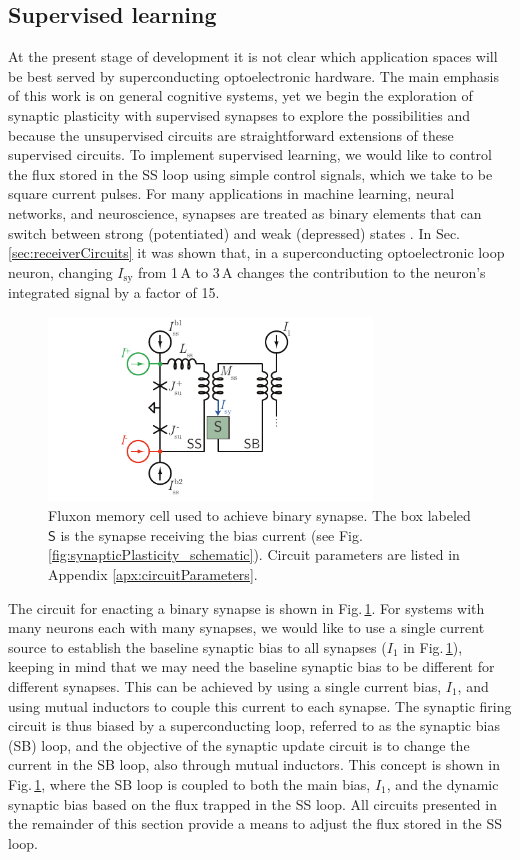 \documentclass[twocolumn]{article}
\begin{document}
\subsection{\label{sec:supervised}Supervised learning}
At the present stage of development it is not clear which application spaces will be best served by superconducting optoelectronic hardware. The main emphasis of this work is on general cognitive systems, yet we begin the exploration of synaptic plasticity with supervised synapses to explore the possibilities and because the unsupervised circuits are straightforward extensions of these supervised circuits. To implement supervised learning, we would like to control the flux stored in the SS loop using simple control signals, which we take to be square current pulses. For many applications in machine learning, neural networks, and neuroscience, synapses are treated as binary elements that can switch between strong (potentiated) and weak (depressed) states \cite{amfu1994,fuab2007,lide2015}. In Sec.\,\ref{sec:receiverCircuits} it was shown that, in a superconducting optoelectronic loop neuron, changing $I_{\mathrm{sy}}$ from 1\,\textmu A to 3\,\textmu A changes the contribution to the neuron's integrated signal by a factor of 15. 
\begin{figure}[t!]
	\centerline{\includegraphics[width=8.6cm]{_synapticPlasticity_binaryCircuit_small.pdf}}
	\caption{\label{fig:synapticPlasticity_binaryCircuit}Fluxon memory cell used to achieve binary synapse. The box labeled $\mathsf{S}$ is the synapse receiving the bias current (see Fig.\,\ref{fig:synapticPlasticity_schematic}). Circuit parameters are listed in Appendix \ref{apx:circuitParameters}.}
\end{figure}
The circuit for enacting a binary synapse is shown in Fig.\,\ref{fig:synapticPlasticity_binaryCircuit}. For systems with many neurons each with many synapses, we would like to use a single current source to establish the baseline synaptic bias to all synapses ($I_1$ in Fig.\,\ref{fig:synapticPlasticity_binaryCircuit}), keeping in mind that we may need the baseline synaptic bias to be different for different synapses. This can be achieved by using a single current bias, $I_1$, and using mutual inductors to couple this current to each synapse. The synaptic firing circuit is thus biased by a superconducting loop, referred to as the synaptic bias (SB) loop, and the objective of the synaptic update circuit is to change the current in the SB loop, also through mutual inductors. This concept is shown in Fig.\,\ref{fig:synapticPlasticity_binaryCircuit}, where the SB loop is coupled to both the main bias, $I_1$, and the dynamic synaptic bias based on the flux trapped in the SS loop. All circuits presented in the remainder of this section provide a means to adjust the flux stored in the SS loop. 
\end{document}
